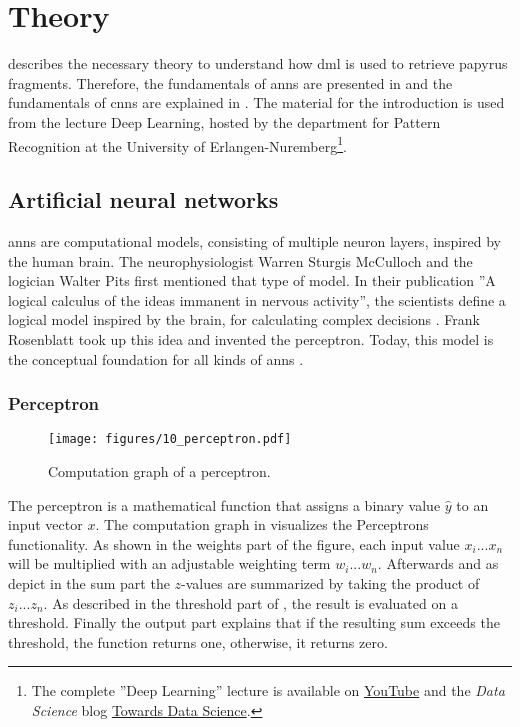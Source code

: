 \chapter{Theory}
\label{chap:theory}
 describes the necessary theory to understand how \ac{dml} is used to retrieve papyrus fragments. Therefore, the fundamentals of \acp{ann} are presented in  and the fundamentals of \acp{cnn} are explained in . The material for the introduction is used from the lecture Deep Learning, hosted by the department for Pattern Recognition at the University of Erlangen-Nuremberg\footnote{The complete ''Deep Learning'' lecture is available on  \href{https://www.youtube.com/watch?v=p-_Stl0t3kU&list=PLpOGQvPCDQzvgpD3S0vTy7bJe2pf_yJFj}{YouTube} and the \textit{Data Science} blog \href{https://towardsdatascience.com/all-you-want-to-know-about-deep-learning-8d68dcffc258}{Towards Data Science}.}.   

\section{Artificial neural networks}
\label{sec:anns}
\acp{ann} are computational models, consisting of multiple neuron layers, inspired by the human brain. The neurophysiologist Warren Sturgis McCulloch and the logician Walter Pits first mentioned that type of model. In their publication ''A logical calculus of the ideas immanent in nervous activity'', the scientists define a logical model inspired by the brain, for calculating complex decisions \cite{mcculloch43a}. Frank Rosenblatt took up this idea and invented the perceptron. Today, this model is the conceptual foundation for all kinds of \acp{ann} \cite{rosenblatt1958perceptron}.\\

\subsection{Perceptron}
\label{subsec:perceptron}
\begin{figure}[t]
	\texttt{[image: figures/10\_perceptron.pdf]}
	\caption{Computation graph of a perceptron.}
	\label{fig:perceptron}
\end{figure}
%
\noindent The perceptron is a mathematical function that assigns a binary value \(\hat{y}\) to an input vector \(x\).
The computation graph in  visualizes the Perceptrons functionality. As shown in the weights part of the figure, each input value \(x_i ... x_n\) will be multiplied with an adjustable weighting term \(w_i ... w_n\). Afterwards and as depict in the sum part the \(z\)-values are summarized by taking the product of \(z_i ... z_n\). As described in the threshold part of , the result is evaluated on a threshold. Finally the output part explains that if the resulting sum exceeds the threshold, the function returns one, otherwise, it returns zero.\\

